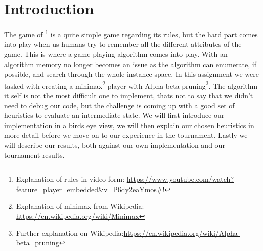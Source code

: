 \section{Introduction}\label{intro}
The game of \quarto{}\footnote{Explanation of rules in video form: 
\url{https://www.youtube.com/watch?feature=player_embedded&v=P6dy2eaYmos#!}}
is a quite simple game regarding its rules, but the hard part
comes into play when us humans try to remember all the different attributes of the
game. This is where a game playing algorithm comes into play. With an algorithm
memory no longer becomes an issue as the algorithm can enumerate, if possible, and search
through the whole instance space. In this assignment
we were tasked with creating a minimax\footnote{Explanation of minimax from Wikipedia:
\url{https://en.wikipedia.org/wiki/Minimax}} player with Alpha-beta pruning\footnote{
Further explanation on Wikipedia:\url{https://en.wikipedia.org/wiki/Alpha-beta_pruning}}.
The algorithm it self is not the most difficult one to implement, thats not to say that
we didn't need to debug our code, but the challenge is coming up with a good set of
heuristics to evaluate an intermediate state. We will first introduce our implementation
in a birds eye view, we will then explain our chosen heuristics in more detail before
we move on to our experience in the tournament. Lastly we will describe our results, both
against our own implementation and our tournament results.
